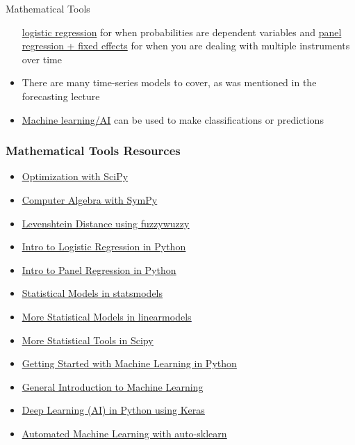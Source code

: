 \documentclass[handout, 11pt]{beamer}
\begin{document}
\begin{section}{Mathematical Tools}
\begin{frame}
\begin{itemize}
\underline{logistic regression}
for when
probabilities are dependent variables and
\underline{panel regression + fixed effects}
for when you are dealing
with multiple instruments over time
\vfill
\item There are many time-series models to cover, as was mentioned in the forecasting lecture
\vfill
\item \underline{Machine learning/AI}
can be used to make classifications or predictions
\end{itemize}
\end{frame}
\begin{frame}
\frametitle{Mathematical Tools Resources}
\begin{itemize}
\item \textcolor{blue}{\underline{\href{https://towardsdatascience.com/optimization-with-scipy-and-application-ideas-to-machine-learning-81d39c7938b8}{Optimization with SciPy}}}
\vfill
\item \textcolor{blue}{\underline{\href{https://docs.sympy.org/latest/tutorial/preliminaries.html}{Computer Algebra with SymPy}}}
\vfill
\item \textcolor{blue}{\underline{\href{https://www.geeksforgeeks.org/fuzzywuzzy-python-library/}{Levenshtein Distance using fuzzywuzzy}}}
\vfill
\item \textcolor{blue}{\underline{\href{https://towardsdatascience.com/logistic-regression-python-7c451928efee}{Intro to Logistic Regression in Python}}}
\vfill
\item \textcolor{blue}{\underline{\href{https://medium.com/pew-research-center-decoded/using-fixed-and-random-effects-models-for-panel-data-in-python-a795865736ab}{Intro to Panel Regression in Python}}}
\vfill
\item \textcolor{blue}{\underline{\href{https://www.statsmodels.org/stable/py-modindex.html}{Statistical Models in statsmodels}}}
\vfill
\item \textcolor{blue}{\underline{\href{https://bashtage.github.io/linearmodels/doc/index.html}{More Statistical Models in linearmodels}}}
\vfill
\item \textcolor{blue}{\underline{\href{https://docs.scipy.org/doc/scipy/reference/stats.html}{More Statistical Tools in Scipy}}}
\vfill
\item \textcolor{blue}{\underline{\href{https://machinelearningmastery.com/machine-learning-in-python-step-by-step/}{Getting Started with Machine Learning in Python}}}
\vfill
\item \textcolor{blue}{\underline{\href{https://machinelearningmastery.com/start-here/}{General Introduction to Machine Learning}}}
\vfill
\item \textcolor{blue}{\underline{\href{https://datacamp.com/community/tutorials/deep-learning-python}{Deep Learning (AI) in Python using Keras}}}
\vfill
\item \textcolor{blue}{\underline{\href{https://github.com/automl/auto-sklearn/}{Automated Machine Learning with auto-sklearn}}}
\end{itemize}
\end{frame}
\end{section}
\end{document}
